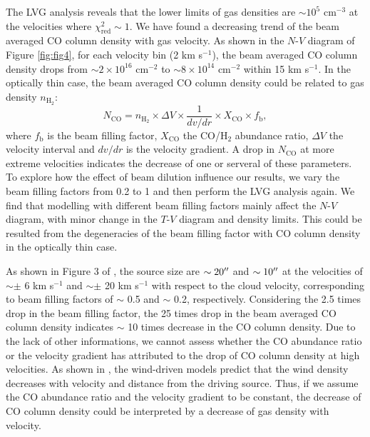 The LVG analysis reveals that the lower limits of gas densities are $\sim 10^5$ cm$^{-3}$ at the velocities where $\chi^2_{\mathrm{red}} \sim 1$. We have found a decreasing trend of the beam averaged CO column density with gas velocity. As shown in the $N$-$V$ diagram of Figure \ref{fig:fig4}, for each velocity bin (2 km s$^{-1}$), the beam averaged CO column density drops from $\sim 2 \times  10^{16} $ cm$^{-2}$ to $\sim 8 \times 10^{14}$ cm$^{-2}$ within 15 km s$^{-1}$. In the optically thin case, the beam averaged CO column density could be related to gas density $n_{\mathrm{H}_2}$: 
\begin{equation}
N_{\mathrm{CO}} = n_{\mathrm{H}_2} \times \Delta V \times \frac{1}{dv/dr} \times X_{\mathrm{CO}} \times f_{\mathrm{b}}, 
\end{equation}
where $f_{\mathrm{b}}$ is the beam filling factor, $X_{\mathrm{CO}}$ the CO/H$_2$ abundance ratio, $\Delta V$ the velocity interval and $dv/dr$ is the velocity gradient. A drop in $N_{\mathrm{CO}}$ at more extreme velocities indicates the decrease of one or serveral of these parameters. 
To explore how the effect of beam dilution influence our results, we vary the beam filling factors from 0.2 to 1 and then perform the LVG analysis again. We find that modelling with different beam filling factors mainly affect the $N$-$V$ diagram, with minor change in the $T$-$V$ diagram and density limits. This could be resulted from the degeneracies of the beam filling factor with CO column density in the optically thin case. 

As shown in Figure 3 of \citet{2009ApJ...696...66Q}, the source size are $\sim 20\mbox{$^{\prime\prime}$}$ and $\sim 10\mbox{$^{\prime\prime}$}$ at the velocities of $\sim \pm$ 6 km s$^{-1}$ and $\sim \pm$ 20 km s$^{-1}$ with respect to the cloud velocity, corresponding to beam filling factors of $\sim$ 0.5 and $\sim$ 0.2, respectively. Considering the 2.5 times drop in the beam filling factor, the 25 times drop in the beam averaged CO column density indicates $\sim$ 10 times decrease in the CO column density. Due to the lack of other informations, we cannot assess whether the CO abundance ratio or the velocity gradient has attributed to the drop of CO column density at high velocities. As shown in \citet{2007prpl.conf..245A}, the wind-driven models predict that the wind density decreases with velocity and distance from the driving source. Thus, if we assume the CO abundance ratio and the velocity gradient to be constant, the decrease of CO column density could be interpreted by a decrease of gas density with velocity.